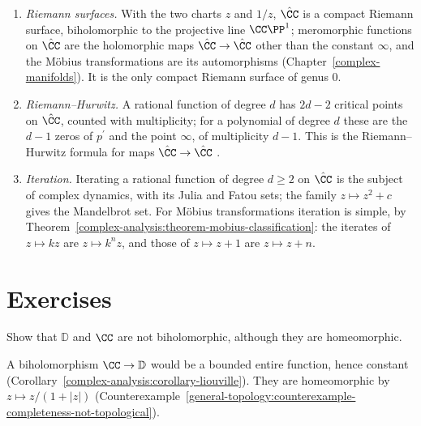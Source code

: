 \begin{remark}\label{complex-analysis:remark-riemann-sphere}
\begin{enumerate}
\item \emph{Riemann surfaces.} With the two charts $z$ and $1/z$, $\hat{\CC}$ is a compact Riemann surface, biholomorphic to the projective line $\CC\PP^1$; meromorphic functions on $\hat{\CC}$ are the holomorphic maps
$\hat{\CC} \to \hat{\CC}$ other than the constant $\infty$, and the M\"obius transformations are its automorphisms (Chapter~\ref{complex-manifolds}). It is the only compact Riemann surface of genus $0$.
\item \emph{Riemann--Hurwitz.} A rational function of degree $d$ has $2d - 2$ critical points on $\hat{\CC}$, counted with multiplicity; for a polynomial of degree $d$ these are the $d - 1$ zeros of $p^{\prime}$ and the point
$\infty$, of multiplicity $d - 1$. This is the Riemann--Hurwitz formula for maps $\hat{\CC} \to \hat{\CC}$ \cite{forster-riemann-surfaces}.
\item \emph{Iteration.} Iterating a rational function of degree $d \geq 2$ on $\hat{\CC}$ is the subject of complex dynamics, with its Julia and Fatou sets; the family $z \mapsto z^2 + c$ gives the Mandelbrot set.
For M\"obius transformations iteration is simple, by Theorem~\ref{complex-analysis:theorem-mobius-classification}: the iterates of $z \mapsto kz$ are $z \mapsto k^nz$, and those of $z \mapsto z + 1$ are $z \mapsto z + n$.
\end{enumerate}
\end{remark}

\section{Exercises}\label{complex-analysis:section-exercises}

\begin{exercise}\label{complex-analysis:exercise-disc-not-plane}
Show that $\mathbb{D}$ and $\CC$ are not biholomorphic, although they are homeomorphic.
\end{exercise}

\begin{solution}
A biholomorphism $\CC \to \mathbb{D}$ would be a bounded entire function, hence constant (Corollary~\ref{complex-analysis:corollary-liouville}). They are homeomorphic by
$z \mapsto z/(1 + |z|)$ (Counterexample~\ref{general-topology:counterexample-completeness-not-topological}).
\end{solution}

